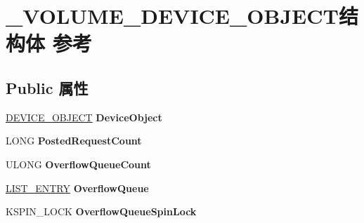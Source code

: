 \hypertarget{struct___v_o_l_u_m_e___d_e_v_i_c_e___o_b_j_e_c_t}{}\section{\+\_\+\+V\+O\+L\+U\+M\+E\+\_\+\+D\+E\+V\+I\+C\+E\+\_\+\+O\+B\+J\+E\+C\+T结构体 参考}
\label{struct___v_o_l_u_m_e___d_e_v_i_c_e___o_b_j_e_c_t}
\subsection*{Public 属性}
\begin{DoxyCompactItemize}
\item 
\mbox{\label{struct___v_o_l_u_m_e___d_e_v_i_c_e___o_b_j_e_c_t_a457620c28b100f21fbf454ce46cc8908}} 
\hyperlink{struct___d_e_v_i_c_e___o_b_j_e_c_t}{D\+E\+V\+I\+C\+E\+\_\+\+O\+B\+J\+E\+CT} {\bfseries Device\+Object}
\item 
\mbox{\label{struct___v_o_l_u_m_e___d_e_v_i_c_e___o_b_j_e_c_t_adca4e87f79de504e8750f682ee840565}} 
L\+O\+NG {\bfseries Posted\+Request\+Count}
\item 
\mbox{\label{struct___v_o_l_u_m_e___d_e_v_i_c_e___o_b_j_e_c_t_acdacf8ceea710b3e15270b449f216f53}} 
U\+L\+O\+NG {\bfseries Overflow\+Queue\+Count}
\item 
\mbox{\label{struct___v_o_l_u_m_e___d_e_v_i_c_e___o_b_j_e_c_t_a8848187cec5d55d62828318935b77dc4}} 
\hyperlink{struct___l_i_s_t___e_n_t_r_y}{L\+I\+S\+T\+\_\+\+E\+N\+T\+RY} {\bfseries Overflow\+Queue}
\item 
\mbox{\label{struct___v_o_l_u_m_e___d_e_v_i_c_e___o_b_j_e_c_t_a5449c79e01777ee3dd922f15effd097c}} 
K\+S\+P\+I\+N\+\_\+\+L\+O\+CK {\bfseries Overflow\+Queue\+Spin\+Lock}
\item 
\mbox{\label{struct___v_o_l_u_m_e___d_e_v_i_c_e___o_b_j_e_c_t_a437c30ab6ab871071c95d96e6ba6a736}} 

\end{DoxyCompactItemize}
